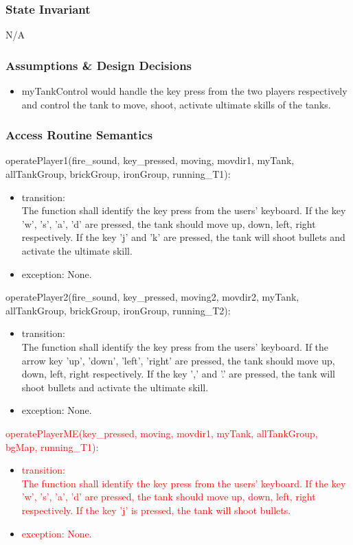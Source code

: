 \documentclass[12pt, titlepage]{article}
\begin{document}
		\subsubsection{State Invariant}
		N/A
		
		\subsubsection{Assumptions \& Design Decisions}
		\begin{itemize}
		\item myTankControl would handle the key press from the two players respectively and control the tank to move, shoot, activate ultimate skills of the tanks.
		\end{itemize}
		
		\subsubsection{Access Routine Semantics}
        operatePlayer1(fire\_sound, key\_pressed, moving, movdir1, myTank, allTankGroup, brickGroup, ironGroup, running\_T1):
		\begin{itemize}
		\item transition: \\
		The function shall identify the key press from the users' keyboard. If the key 'w', 's', 'a', 'd' are pressed, the tank should move up, down, left, right respectively. If the key 'j' and 'k' are pressed, the tank will shoot bullets and activate the ultimate skill.
		
		\item exception: None.
        \end{itemize}
        
        operatePlayer2(fire\_sound, key\_pressed, moving2, movdir2, myTank, allTankGroup, brickGroup, ironGroup, running\_T2):
		\begin{itemize}
		\item transition: \\
		The function shall identify the key press from the users' keyboard. If the arrow key 'up', 'down', 'left', 'right' are pressed, the tank should move up, down, left, right respectively. If the key ',' and '.' are pressed, the tank will shoot bullets and activate the ultimate skill.
		
		\item exception: None.
        \end{itemize}

        \textcolor{red}{operatePlayerME(key\_pressed, moving, movdir1, myTank, allTankGroup, bgMap, running\_T1):}
		\begin{itemize}
		\item \textcolor{red}{transition:} \\
		\textcolor{red}{The function shall identify the key press from the users' keyboard. If the key 'w', 's', 'a', 'd' are pressed, the tank should move up, down, left, right respectively. If the key 'j' is pressed, the tank will shoot bullets.}
		
		\item \textcolor{red}{exception: None.}
        \end{itemize}
        
\end{document}
